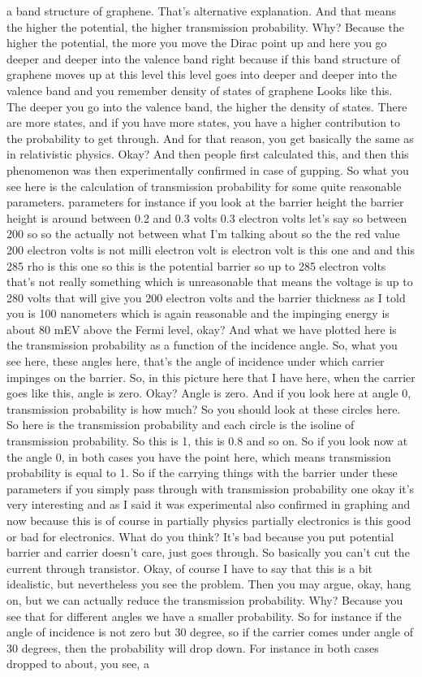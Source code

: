 a band structure of graphene. That's alternative explanation. And that means the higher the potential, the higher transmission probability. Why? Because the higher the potential, the more you move the Dirac point up and here you go deeper and deeper into the valence band right because if this band structure of graphene moves up at this level this level goes into deeper and deeper into the valence band and you remember density of states of graphene Looks like this. The deeper you go into the valence band, the higher the density of states. There are more states, and if you have more states, you have a higher contribution to the probability to get through. And for that reason, you get basically the same as in relativistic physics. Okay? And then people first calculated this, and then this phenomenon was then experimentally confirmed in case of gupping. So what you see here is the calculation of transmission probability for some quite reasonable parameters. parameters for instance if you look at the barrier height the barrier height is around between 0.2 and 0.3 volts 0.3 electron volts let's say so between 200 so so the actually not between what I'm talking about so the the red value 200 electron volts is not milli electron volt is electron volt is this one and and this 285 rho is this one so this is the potential barrier so up to 285 electron volts that's not really something which is unreasonable that means the voltage is up to 280 volts that will give you 200 electron volts and the barrier thickness as I told you is 100 nanometers which is again reasonable and the impinging energy is about 80 mEV above the Fermi level, okay? And what we have plotted here is the transmission probability as a function of the incidence angle. So, what you see here, these angles here, that's the angle of incidence under which carrier impinges on the barrier. So, in this picture here that I have here, when the carrier goes like this, angle is zero. Okay? Angle is zero. And if you look here at angle 0, transmission probability is how much? So you should look at these circles here. So here is the transmission probability and each circle is the isoline of transmission probability. So this is 1, this is 0.8 and so on. So if you look now at the angle 0, in both cases you have the point here, which means transmission probability is equal to 1. So if the carrying things with the barrier under these parameters if you simply pass through with transmission probability one okay it's very interesting and as I said it was experimental also confirmed in graphing and now because this is of course in partially physics partially electronics is this good or bad for electronics. What do you think? It's bad because you put potential barrier and carrier doesn't care, just goes through. So basically you can't cut the current through transistor. Okay, of course I have to say that this is a bit idealistic, but nevertheless you see the problem. Then you may argue, okay, hang on, but we can actually reduce the transmission probability. Why? Because you see that for different angles we have a smaller probability. So for instance if the angle of incidence is not zero but 30 degree, so if the carrier comes under angle of 30 degrees, then the probability will drop down. For instance in both cases dropped to about, you see, a 